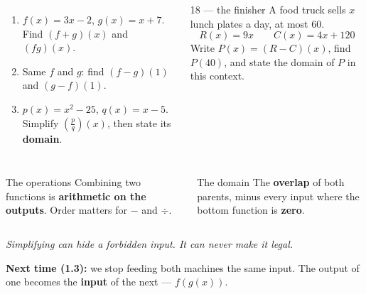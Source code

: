 \documentclass[aspectratio=169, 11pt]{beamer}
\begin{document}
\begin{frame}[t, plain]

  \begin{columns}[T]
      \begin{enumerate}\setlength{\itemsep}{7pt}
        \setcounter{enumi}{14}
        \item \(f(x) = 3x - 2\), \(g(x) = x + 7\). Find \((f+g)(x)\) and \((fg)(x)\).
        \item Same \(f\) and \(g\): find \((f-g)(1)\) and \((g-f)(1)\).
        \item \(p(x) = x^2 - 25\), \(q(x) = x - 5\). Simplify \(\left(\frac{p}{q}\right)(x)\),
              then state its \textbf{domain}.
      \end{enumerate}

      \begin{block}{18 --- the finisher}
        A food truck sells \(x\) lunch plates a day, at most 60.
        \[ R(x) = 9x \qquad C(x) = 4x + 120 \]
        Write \(P(x) = (R - C)(x)\), find \(P(40)\), and state the domain of
        \(P\) in this context.
      \end{block}
  \end{columns}
\end{frame}

\begin{frame}[t, plain]

  \begin{columns}[T]
      \begin{block}{The operations}
        Combining two functions is \textbf{arithmetic on the outputs}. Order
        matters for \(-\) and \(\div\).
      \end{block}
      \begin{block}{The domain}
        The \textbf{overlap} of both parents, minus every input where the bottom
        function is \textbf{zero}.
      \end{block}
  \end{columns}

  \bigskip
  \begin{center}
    \textit{Simplifying can hide a forbidden input. It can never make it legal.}
  \end{center}

  \bigskip
  \textbf{Next time (1.3):} we stop feeding both machines the same input. The
  output of one becomes the \textbf{input} of the next --- \(f(g(x))\).
\end{frame}
\end{document}
